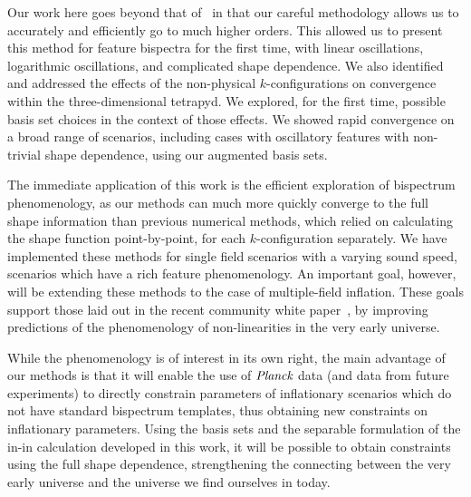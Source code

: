 Our work here goes beyond that of~\cite{Funakoshi} in that our careful methodology
allows us to accurately and efficiently go to much higher orders.
This allowed us to present this method for feature bispectra for the first time,
with linear oscillations, logarithmic oscillations, and complicated shape dependence.
We also identified and addressed the effects
of the non-physical $k$-configurations on convergence within the three-dimensional tetrapyd.
We explored, for the first time, possible basis set choices in the context of those effects.
We showed rapid convergence on a broad range of scenarios,
including cases with oscillatory features with non-trivial shape dependence,
using our augmented basis sets.


The immediate application of this work is the efficient exploration of
bispectrum phenomenology, as our methods can much more quickly
converge to the full shape information than previous numerical methods,
which relied on calculating the shape function point-by-point, for each $k$-configuration separately.
We have implemented these methods for single field scenarios
with a varying sound speed, scenarios which
have a rich feature phenomenology. An important goal, however, will be extending
these methods to the case of multiple-field inflation.
These goals support those laid out in the recent community white paper~\cite{astro2020_png},
by improving predictions of the phenomenology of non-linearities in the very early universe.

While the phenomenology is of interest in its own right,
the main advantage of our methods is that it will enable the use of $\textit{Planck}$ data
(and data from future experiments)
to directly constrain parameters of inflationary scenarios which do not have
standard bispectrum templates, thus obtaining new constraints on inflationary parameters.
Using the basis sets and the separable formulation of the in-in calculation developed in this work,
it will be possible to obtain constraints using the full shape dependence,
strengthening the connecting between the very early universe and the universe we
find ourselves in today.
